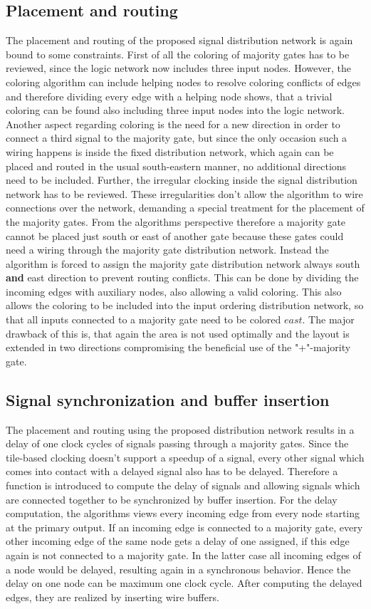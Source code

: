 \subsection{Placement and routing}
The placement and routing of the proposed signal distribution network is again bound to some constraints. First of all the coloring of majority gates has to be reviewed, since the logic network now includes three input nodes. However, the coloring algorithm can include helping nodes to resolve coloring conflicts of edges and therefore dividing every edge with a helping node shows, that a trivial coloring can be found also including three input nodes into the logic network. Another aspect regarding coloring is the need for a new direction in order to connect a third signal to the majority gate, but since the only occasion such a wiring happens is inside the fixed distribution network, which again can be placed and routed in the usual south-eastern manner, no additional directions need to be included. Further, the irregular clocking inside the signal distribution network has to be reviewed. These irregularities don't allow the algorithm to wire connections over the network, demanding a special treatment for the placement of the majority gates. From the algorithms perspective therefore a majority gate cannot be placed just south or east of another gate because these gates could need a wiring through the majority gate distribution network. Instead the algorithm is forced to assign the majority gate distribution network always south \textbf{and} east direction to prevent routing conflicts. This can be done by dividing the incoming edges with auxiliary nodes, also allowing a valid coloring. This also allows the coloring to be included into the input ordering distribution network, so that all inputs connected to a majority gate need to be colored $east$. The major drawback of this is, that again the area is not used optimally and the layout is extended in two directions compromising the beneficial use of the "+"-majority gate.

\subsection{Signal synchronization and buffer insertion}
The placement and routing using the proposed distribution network results in a delay of one clock cycles of signals passing through a majority gates. Since the tile-based clocking doesn't support a speedup of a signal, every other signal which comes into contact with a delayed signal also has to be delayed. Therefore a function is introduced to compute the delay of signals and allowing signals which are connected together to be synchronized by buffer insertion. For the delay computation, the algorithms views every incoming edge from every node starting at the primary output. If an incoming edge is connected to a majority gate, every other incoming edge of the same node gets a delay of one assigned, if this edge again is not connected to a majority gate. In the latter case all incoming edges of a node would be delayed, resulting again in a synchronous behavior. Hence the delay on one node can be maximum one clock cycle. After computing the delayed edges, they are realized by inserting wire buffers. 

